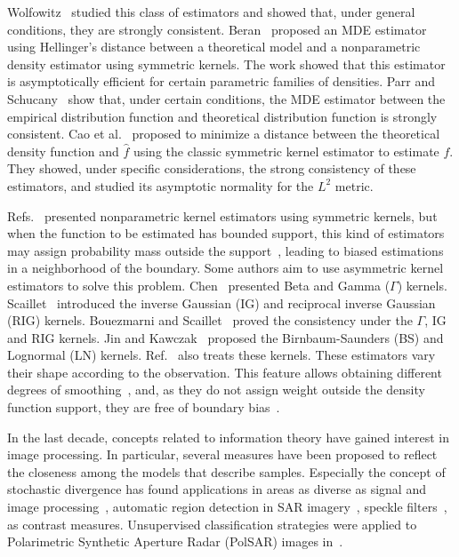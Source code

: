 \documentclass[twocolumn]{svjour3}
\begin{document}
	Wolfowitz~\cite{wolfowitz1953, wolfowitz1957} studied this class of estimators and showed that, under general conditions, they are strongly consistent. 
	Beran~\cite{beran1977} proposed an MDE estimator using Hellinger's distance between a theoretical model and a nonparametric density estimator using symmetric kernels. 
	The work showed that this estimator is asymptotically efficient for certain parametric families of densities. 
	Parr and Schucany~\cite{parr1982} show that, under certain conditions, the MDE estimator between the empirical distribution function and theoretical distribution function is strongly consistent. 
	Cao et al.~\cite{cao1995minimum} proposed to minimize a distance between the theoretical density function and $\widehat{f}$ using the classic symmetric kernel estimator to estimate $f$. 
	They showed, under specific considerations, the strong consistency of these estimators, and studied its asymptotic normality for the $L^2$ metric.
	
	Refs.~\cite{Parzen62,Roseanblatt56} presented nonparametric kernel estimators using symmetric kernels, but when the function to be estimated has bounded support, this kind of estimators may assign probability mass outside the support~\cite{Silverman1986}, leading to biased estimations in a neighborhood of the boundary.
	Some authors aim to use asymmetric kernel estimators to solve this problem. 
	Chen~\cite{chen1999,chensx2000} presented Beta and Gamma ($\Gamma$) kernels.
	Scaillet~\cite{Scaillet2004} introduced the inverse Gaussian (IG) and reciprocal inverse Gaussian (RIG) kernels.
	Bouezmarni and Scaillet~\cite{bouezmarni2005} proved the consistency under the $\Gamma$, IG and RIG kernels. 
	Jin and Kawczak~\cite{Jin2003} proposed the Birnbaum-Saunders (BS) and Lognormal (LN) kernels. 
	Ref.~\cite{libengue2013} also treats these kernels. 
	These estimators vary their shape according to the observation. This feature allows obtaining different degrees of smoothing~\cite{Scaillet2004}, and, as they do not assign weight outside the density function support, they are free of boundary bias~\cite{chensx2000}.
	
	In the last decade, concepts related to information theory have gained interest in image processing. 
	In particular, several measures have been proposed to reflect the closeness among the models that describe samples. 
	Especially the concept of stochastic divergence has found applications in areas as diverse as signal and image processing~\cite{Aviyente2007}, automatic region detection in SAR imagery~\cite{SilvaCribariFrery:ImprovedLikelihood:Environmetrics,Nascimento2009}, 
	speckle filters~\cite{Penna2019}, as contrast measures. 
	Unsupervised classification strategies were applied to Polarimetric Synthetic Aperture Radar (PolSAR) images in~\cite{Carvalho2019}.
	
\end{document}
